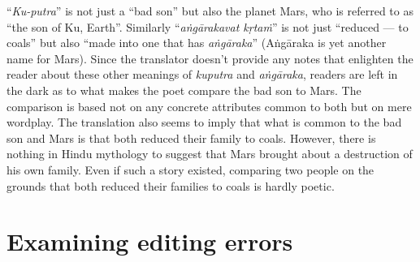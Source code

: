 “\textsl{Ku-putra}” is not just a “bad son” but also the planet Mars, who is referred to as “the son of Ku, Earth”. Similarly “\textsl{aṅgārakavat kṛtaṁ}” is not just “reduced --- to coals” but also “made into one that has \textsl{aṅgāraka}” (Aṅgāraka is yet another name for Mars). Since the translator doesn’t provide any notes that enlighten the reader about these other meanings of \textsl{kuputra} and \textsl{aṅgāraka}, readers are left in the dark as to what makes the poet compare the bad son to Mars. The comparison is based not on any concrete attributes common to both but on mere wordplay. The translation also seems to imply that what is common to the bad son and Mars is that both reduced their family to coals. However, there is nothing in Hindu mythology to suggest that Mars brought about a destruction of his own family. Even if such a story existed, comparing two people on the grounds that both reduced their families to coals is hardly poetic. 

\section*{Examining editing errors}

